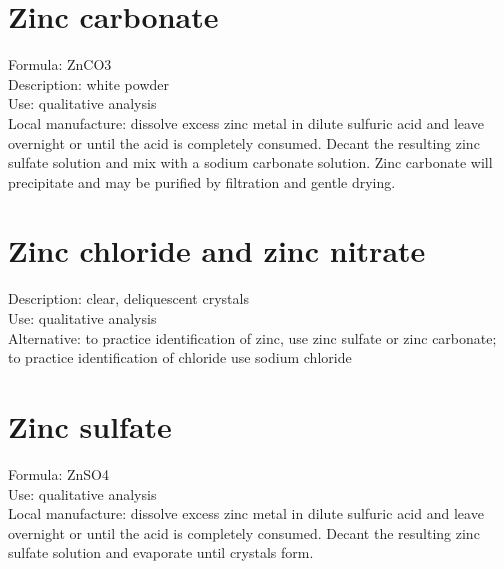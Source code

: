 \section{Zinc carbonate}
Formula: ZnCO3\\
Description: white powder\\
Use: qualitative analysis\\
Local manufacture: dissolve excess zinc metal 
in dilute sulfuric acid and leave overnight 
or until the acid is completely consumed. 
Decant the resulting zinc sulfate solution and 
mix with a sodium carbonate solution. 
Zinc carbonate will precipitate 
and may be purified by filtration and gentle drying.

\section{Zinc chloride and zinc nitrate}
Description: clear, 
deliquescent crystals\\
Use: qualitative analysis\\
Alternative: to practice identification of zinc, 
use zinc sulfate or zinc carbonate; 
to practice identification of chloride use sodium chloride

\section{Zinc sulfate}
Formula: ZnSO4\\
Use: qualitative analysis\\
Local manufacture: dissolve excess zinc metal in dilute sulfuric acid 
and leave overnight or until the acid is completely consumed. 
Decant the resulting zinc sulfate solution and evaporate until crystals form.
